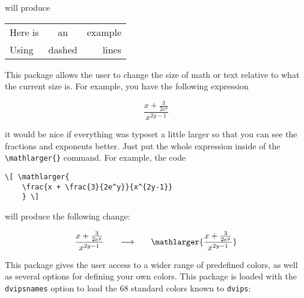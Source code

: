 \documentclass[letterpaper,12pt]{article}
\begin{document}
\begin{description}[align=margin,labelsep=0pt,leftmargin=0pt,style=multiline,labelwidth=63pt]
will produce

\Needspace*{1in}
\begin{shaded*}
\begin{center}
\begin{tabular}{::l:c|r||}
Here is & an & example \\ \hdashline
Using & dashed & lines \\ \hline
\end{tabular}
\end{center}
\end{shaded*}


{}
\item[\href{http://mirror.hmc.edu/ctan/macros/latex/contrib/relsize/relsize-doc.pdf}{\texttt{relsize}}] This package allows the user to change the size of math or text relative to what the current size is. For example, you have the following expression
\Needspace*{1in}
\begin{shaded*}
\[ \frac{x + \frac{3}{2e^y}}{x^{2y-1}} \]
\end{shaded*}
it would be nice if everything was typeset a little larger so that you can see the fractions and exponents better. Just put the whole expression inside of the \verb|\mathlarger{}| command. For example, the code

\begin{Verbatim}[frame=single,gobble=0,fontsize=\small]
\[ \mathlarger{
	\frac{x + \frac{3}{2e^y}}{x^{2y-1}}
	} \]
\end{Verbatim}

will produce the following change:

\Needspace*{1in}
\begin{shaded*}
\[ \frac{x + \frac{3}{2e^y}}{x^{2y-1}} \qquad{\longrightarrow}\qquad
\mathlarger{
	\frac{x + \frac{3}{2e^y}}{x^{2y-1}}
	} \]
\end{shaded*}


{}
\item[\href{http://mirror.unl.edu/ctan/macros/latex/contrib/xcolor/xcolor.pdf}{\texttt{xcolor}}] This package gives the user access to a wider range of predefined colors, as well as several options for defining your own colors. This package is loaded with the \texttt{dvipsnames} option to load the 68 standard colors known to \texttt{dvips}:


\end{description}
\end{document}
